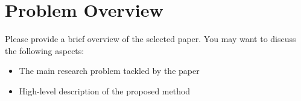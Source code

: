 \section{Problem Overview}
\label{section:intro}
Please provide a brief overview of the selected paper. You may want to discuss the following aspects:
\begin{itemize}
    \item The main research problem tackled by the paper
    \item High-level description of the proposed method
\end{itemize}